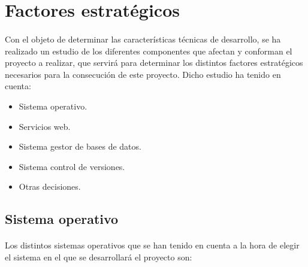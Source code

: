 \section{Factores estratégicos}\label{facEst}

\paragraph{}Con el objeto de determinar las características técnicas de
desarrollo, se ha realizado un estudio de los diferentes componentes que afectan
y conforman el proyecto a realizar, que servirá para determinar los distintos
factores estratégicos necesarios para la consecución de este proyecto. Dicho
estudio ha tenido en cuenta:

\begin{itemize}
 \item Sistema operativo.
 \item Servicios web.
 \item Sistema gestor de bases de datos.
 \item Sistema control de versiones.
 \item Otras decisiones.
\end{itemize}

\subsection{Sistema operativo}
   \paragraph{}Los distintos sistemas operativos que se han tenido en cuenta a
   la hora de elegir el sistema en el que se desarrollará el proyecto son:

